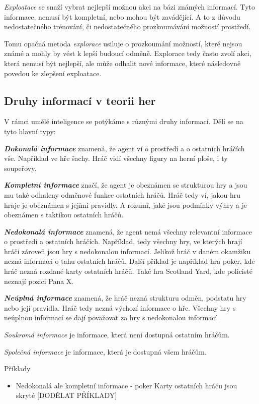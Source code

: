 \emph{Exploatace} se snaží vybrat nejlepší možnou akci na bázi známých informací.
Tyto informace, nemusí být kompletní, nebo mohou být zavádějící.
A to z důvodu nedostatečného trénování, či nedostatečného prozkoumávání možností prostředí.

Tomu opačná metoda \emph{explorace} usiluje o prozkoumání možností, které nejsou známé a mohly by vést k lepší budoucí odměně.
Explorace tedy často zvolí akci, která nemusí být nejlepší, ale může odhalit nové informace, které následovně povedou ke zlepšení exploatace.

\subsection{Druhy informací v teorii her}\label{subsec:druhy-informaci-v-teorii-her}
V rámci umělé inteligence se potýkáme s různými druhy informací.
Dělí se na tyto hlavní typy:

\textbf{\emph{Dokonalá informace}} znamená, že agent ví o prostředí a o ostatních hráčích vše.
Například ve hře šachy.
Hráč vidí všechny figury na herní ploše, i ty soupeřovy.

\textbf{\emph{Kompletní informace}} značí, že agent je obeznámen se strukturou hry a jsou mu také odhaleny odměnové funkce ostatních hráčů.
Hráč tedy ví, jakou hru hraje je obeznámen s jejími pravidly.
A rozumí, jaké jsou podmínky výhry a je obeznámen s taktikou ostatních hráčů.

\textbf{\emph{Nedokonalá informace}} znamená, že agent nemá všechny relevantní informace o prostředí a ostatních hráčích.
Například, tedy všechny hry, ve kterých hrají hráči zároveň jsou hry s nedokonalou informací.
Jelikož hráč v daném okamžiku nezná informaci o tahu ostatních hráčů.
Další příklad je například hra poker, kde hráč nezná rozdané karty ostatních hráčů.
Také hra Scotland Yard, kde policisté neznají pozici Pana X\@.

\textbf{\emph{Neúplná informace}} znamená, že hráč nezná strukturu odměn, podstatu hry nebo její pravidla.
Hráč tedy nezná výchozí informace o hře.
Všechny hry s neúplnou informací se dají považovat za hry s nedokonalou informací.

\emph{Soukromá informace} je informace, která není dostupná ostatním hráčům.

\emph{Společná informace} je informace, která je dostupná všem hráčům.

Příklady
\begin{itemize}
  \item Nedokonalá ale kompletní informace - poker
    Karty ostatních hráču jsou skryté
    {\color {red} [DODĚLAT PŘÍKLADY]}


\end{itemize}


